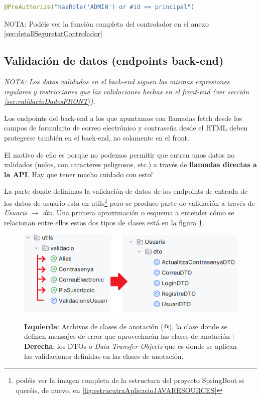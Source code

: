 \documentclass[a4paper,12pt]{report}
\begin{document}
\begin{lstlisting}[language=java, basicstyle=\ttfamily\footnotesize, keywordstyle=\color{magenta}]
	@PreAuthorize("hasRole('ADMIN') or #id == principal")
\end{lstlisting}

	NOTA: Podéis ver la función completa del controlador en el anexo \ref{sec:detallSeguretatControlador}
	
	
		
		

		
		
			\subsection{Validación de datos (endpoints back-end)}
			\label{sec:validacioDadesBACK}
			
			\textit{NOTA: Los datos validados en el back-end siguen las mismas expresiones regulares y restricciones que las validaciones hechas en el front-end (ver sección \ref{sec:validacioDadesFRONT}).}
			
			Los endpoints del back-end a los que apuntamos con llamadas fetch desde los campos de formulario de correo electrónico y contraseña desde el HTML deben protegerse también en el back-end, no solamente en el front.
			
			El motivo de ello es porque no podemos permitir que entren unos datos no validados (nulos, con caracteres peligrosos, etc.) a través de \textbf{llamadas directas a la API}. Hay que tener mucho cuidado con esto! 
			
			La parte donde definimos la validación de datos de los endpoints de entrada de los datos de usuario está en utils\footnote{podéis ver la imagen completa de la estructura del proyecto SpringBoot si queréis, de nuevo, en \ref{fig:estrucutraAplicacioJAVARESOURCES}} pero se produce parte de validación a través de \textit{Usuaris} $\rightarrow$ \textit{dto}. Una primera aproximación o esquema a entender cómo se relacionan entre ellos estos dos tipos de clases está en la figura \ref{fig:validacioBackArxius}.
			
			
			
			\FloatBarrier
			\setlength{\belowcaptionskip}{3pt}
			\begin{figure}[H]
				\centering
				\caption{\textbf{Izquierda}: Archivos de clases de anotación (@), la clase donde se definen mensajes de error que aprovecharán las clases de anotación $|$  \textbf{Derecha}: los DTOs o \textit{Data Transfer Objects} que es donde se aplican las validaciones definidas en las clases de anotación.}
				\includegraphics[width=.8\linewidth]{img/validacioBackArxius.png}
				\label{fig:validacioBackArxius}
			\end{figure}
			\FloatBarrier
			
\end{document}
